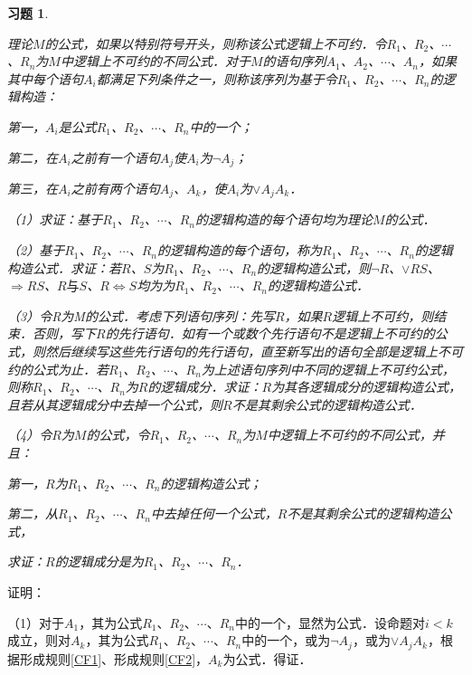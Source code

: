 \documentclass[12pt, a4paper, oneside]{book}
\newtheorem{exer}{习题}
\begin{document}
			\begin{exer}\label{exer33}
				\hfill\par
				理论$M$的公式，如果以特别符号开头，则称该公式逻辑上不可约．令$R_1$、$R_2$、$\cdots$、$R_n$为$M$中逻辑上不可约的不同公式．对于$M$的语句序列$A_1$、$A_2$、$\cdots$、$A_n$，如果其中每个语句$A_i$都满足下列条件之一，则称该序列为基于令$R_1$、$R_2$、$\cdots$、$R_n$的逻辑构造：
				\par
				第一，$A_i$是公式$R_1$、$R_2$、$\cdots$、$R_n$中的一个；
				\par
				第二，在$A_i$之前有一个语句$A_j$使$A_i$为$\neg A_j$；
				\par
				第三，在$A_i$之前有两个语句$A_j$、$A_k$，使$A_i$为$\lor A_jA_k$．
				\par
				（1）求证：基于$R_1$、$R_2$、$\cdots$、$R_n$的逻辑构造的每个语句均为理论$M$的公式．
				\par
				（2）基于$R_1$、$R_2$、$\cdots$、$R_n$的逻辑构造的每个语句，称为$R_1$、$R_2$、$\cdots$、$R_n$的逻辑构造公式．求证：若$R$、$S$为$R_1$、$R_2$、$\cdots$、$R_n$的逻辑构造公式，则$\neg R$、$\lor RS$、$\Rightarrow RS$、$R\text{与}S$、$R\Leftrightarrow S$均为为$R_1$、$R_2$、$\cdots$、$R_n$的逻辑构造公式．
				\par
				（3）令R为M的公式．考虑下列语句序列：先写$R$，如果$R$逻辑上不可约，则结束．否则，写下$R$的先行语句．如有一个或数个先行语句不是逻辑上不可约的公式，则然后继续写这些先行语句的先行语句，直至新写出的语句全部是逻辑上不可约的公式为止．若$R_1$、$R_2$、$\cdots$、$R_n$为上述语句序列中不同的逻辑上不可约公式，则称$R_1$、$R_2$、$\cdots$、$R_n$为$R$的逻辑成分．求证：$R$为其各逻辑成分的逻辑构造公式，且若从其逻辑成分中去掉一个公式，则$R$不是其剩余公式的逻辑构造公式．
				\par
				（4）令$R$为$M$的公式，令$R_1$、$R_2$、$\cdots$、$R_n$为$M$中逻辑上不可约的不同公式，并且：
				\par
				第一，$R$为$R_1$、$R_2$、$\cdots$、$R_n$的逻辑构造公式；
				\par
				第二，从$R_1$、$R_2$、$\cdots$、$R_n$中去掉任何一个公式，$R$不是其剩余公式的逻辑构造公式，
				\par
				求证：$R$的逻辑成分是为$R_1$、$R_2$、$\cdots$、$R_n$．
			\end{exer}
			证明：
			\par
			（1）对于$A_1$，其为公式$R_1$、$R_2$、$\cdots$、$R_n$中的一个，显然为公式．设命题对$i<k$成立，则对$A_k$，其为公式$R_1$、$R_2$、$\cdots$、$R_n$中的一个，或为$\neg A_j$，或为$\lor A_jA_k$，根据形成规则\ref{CF1}、形成规则\ref{CF2}，$A_k$为公式．得证．
\end{document}
